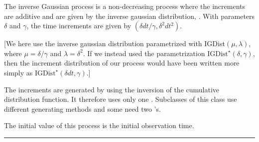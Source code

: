 
The inverse Gaussian process is a non-decreasing process
where the increments are additive and are given by the
inverse gaussian distribution,
.
With parameters $\delta$ and $\gamma$, the
time increments are given by
$(\delta  dt/\gamma,
\delta^2 dt^2)$.


[We here use the inverse gaussian distribution
parametrized with {IGDist}$(\mu,\lambda)$, where $\mu=\delta/\gamma$
and $\lambda=\delta^2$.  If we instead used the parametrization
$\textrm{IGDist}^\star(\delta, \gamma)$,
then the increment distribution of our process would have been written
more simply as $\textrm{IGDist}^\star(\delta  dt, \gamma)$.]

The increments are generated by using
the inversion of the cumulative distribution function.
It therefore uses only one .
Subclasses of this class use different generating methods and some need
two 's.

The initial value of this process is the initial observation time.


\bigskip\hrule\bigskip

